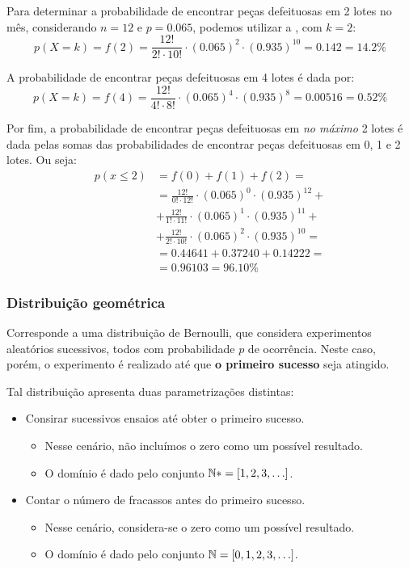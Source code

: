 \begin{sol}
Para determinar a probabilidade de encontrar peças defeituosas em 2 lotes no
mês, considerando $n=12$ e $p=0.065$, podemos utilizar a
, com $k=2$:
\[
p(X=k) = f(2) = \frac{12!}{2! \cdot 10!} \cdot (0.065)^2 \cdot (0.935)^{10} =
0.142 = 14.2 \%
\]

A probabilidade de encontrar peças defeituosas em 4 lotes é dada por:
\[
p(X=k) = f(4) = \frac{12!}{4! \cdot 8!} \cdot (0.065)^4 \cdot (0.935)^{8} =
0.00516 = 0.52 \%
\]

Por fim, a probabilidade de encontrar peças defeituosas em \emph{no máximo} 2
lotes é dada pelas somas das probabilidades de encontrar peças defeituosas em
0, 1 e 2 lotes. Ou seja:
\begin{align*}
p(x \leq 2) &= f(0) + f(1) + f(2) = \\
&= \frac{12!}{0! \cdot 12!} \cdot (0.065)^{0} \cdot (0.935)^{12} + \\
&+ \frac{12!}{1! \cdot 11!} \cdot (0.065)^{1} \cdot (0.935)^{11} + \\
&+ \frac{12!}{2! \cdot 10!} \cdot (0.065)^{2} \cdot (0.935)^{10} = \\
&= 0.44641 + 0.37240 + 0.14222 = \\
&= 0.96103 = 96.10 \%
\end{align*}
\end{sol}

\subsubsection{Distribuição geométrica}

Corresponde a uma distribuição de Bernoulli, que considera experimentos
aleatórios sucessivos, todos com probabilidade $p$ de ocorrência. Neste caso,
porém, o experimento é realizado até que \textbf{o primeiro sucesso} seja
atingido.

Tal distribuição apresenta duas parametrizações distintas:

\begin{itemize}
    \item Consirar sucessivos ensaios até obter o primeiro sucesso.
        \begin{itemize}
            \item Nesse cenário, não incluímos o zero como um possível
            resultado.
            \item O domínio é dado pelo conjunto $\mathbb{N}* = [1, 2, 3, \ldots]$.
        \end{itemize}
    \item Contar o número de fracassos antes do primeiro sucesso.
        \begin{itemize}
            \item Nesse cenário, considera-se o zero como um possível
            resultado.
            \item O domínio é dado pelo conjunto $\mathbb{N} = [0, 1, 2, 3, \ldots]$.
        \end{itemize}
\end{itemize}

